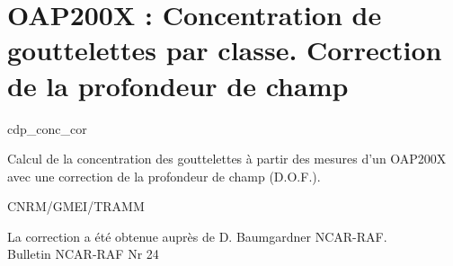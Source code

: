 %
\section{OAP200X : Concentration de gouttelettes par classe. Correction
de la profondeur de champ} 

 {\sf cdp\_conc\_cor}

Calcul de la concentration des gouttelettes \`a partir 
des mesures d'un OAP200X avec une correction 
de la profondeur de champ (D.O.F.).

\bigskip





CNRM/GMEI/TRAMM

La correction a \'et\'e obtenue aupr\`es de D. Baumgardner NCAR-RAF.\\
Bulletin NCAR-RAF Nr 24 \cite{RAF-24}
